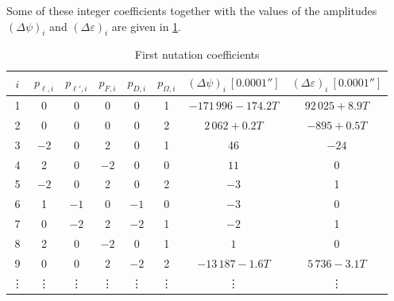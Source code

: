 \documentclass[../main.tex]{subfiles}
\begin{document}
Some of these integer coefficients together with the values of the amplitudes ${(\Delta\psi)}_i$ and ${(\Delta\varepsilon)}_i$  are given in \cref{tab:nutation_coefficients}.
\begin{table}[ht]
  \centering
  \begin{tabular}{|c|ccccc|c|c|}
    \hline
    $i$    & $p_{\ell,i}$ & $p_{\ell',i}$ & $p_{F,i}$ & $p_{D,i}$ & $p_{\Omega,i}$ & ${(\Delta\psi)}_i\ [0.0001'']$ & ${(\Delta\varepsilon)}_i\ [0.0001'']$ \\
    \hline
    1      & 0            & 0             & 0         & 0         & 1              & $-171\,996 -174.2T$            & $92\,025+8.9T$                        \\
    2      & 0            & 0             & 0         & 0         & 2              & $2\,062+0.2T$                  & $-895+0.5T$                           \\
    3      & $-2$         & 0             & 2         & 0         & 1              & 46                             & $-24$                                 \\
    4      & 2            & 0             & $-2$      & 0         & 0              & $11$                           & 0                                     \\
    5      & $-2$         & 0             & 2         & 0         & 2              & $-3$                           & 1                                     \\
    6      & 1            & $-1$          & 0         & $-1$      & 0              & $-3$                           & 0                                     \\
    7      & 0            & $-2$          & 2         & $-2$      & 1              & $-2$                           & 1                                     \\
    8      & 2            & 0             & $-2$      & 0         & 1              & $1$                            & $0$                                   \\
    9      & 0            & 0             & 2         & $-2$      & 2              & $-13\,187-1.6T$                & $5\,736-3.1T$                         \\
    \vdots & \vdots       & \vdots        & \vdots    & \vdots    & \vdots         & \vdots                         & \vdots                                \\
  \end{tabular}
  \caption{First nutation coefficients \cite{montenbruck}}
  \label{tab:nutation_coefficients}
\end{table}
\end{document}
